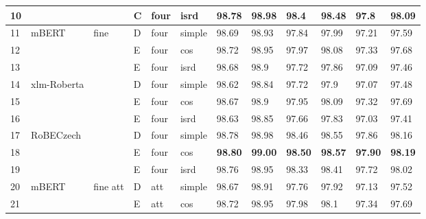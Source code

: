 \begin{table}[!h]
{\begin{tabular}{|l|l|l|l|l|l||llllll|}
10 &                              &                         & C	& four                     & isrd   & 98.78  & 98.98   & 98.4    & 98.48    & 97.8      & 98.09      \\ \hline
11 & \multirow{3}{*}{mBERT} & \multirow{9}{*}{fine}         & D	& four     & simple & 98.69 & 98.93 & 97.84 & 97.99 & 97.21 & 97.59 \\ \cline{1-1} \cline{4-12}
12 &                              &                         & E	& four             & cos    & 98.72  & 98.95   & 97.97   & 98.08    & 97.33     & 97.68      \\ \cline{1-1} \cline{4-12}
13 &                              &                         & E	& four             & isrd   & 98.68  & 98.9    & 97.72   & 97.86    & 97.09     & 97.46      \\ \cline{1-2} \cline{4-12}
14 & \multirow{3}{*}{xlm-Roberta} &                         & D	& four     & simple & 98.62  & 98.84   & 97.72   & 97.9     & 97.07     & 97.48      \\ \cline{1-1} \cline{4-12}
15 &                              &                         & E	& four             & cos    & 98.67  & 98.9    & 97.95   & 98.09    & 97.32     & 97.69      \\ \cline{1-1} \cline{4-12}
16 &                              &                         & E	& four             & isrd   & 98.63  & 98.85   & 97.66   & 97.83    & 97.03     & 97.41      \\ \cline{1-2} \cline{4-12}
17 & \multirow{3}{*}{RoBECzech}   &                         & D	& four     & simple & 98.78  & 98.98   & 98.46   & 98.55    & 97.86     & 98.16      \\ \cline{1-1} \cline{4-12}
18 &                              &                         & E	& four             & cos    & \textbf{98.80}   & \textbf{99.00 }     & \textbf{98.50}    & \textbf{98.57}    & \textbf{97.90 }     & \textbf{98.19 }     \\ \cline{1-1} \cline{4-12}
19 &                              &                         & E	& four             & isrd   & 98.76  & 98.95   & 98.33   & 98.41    & 97.72     & 98.02      \\ \cline{1-2} \cline{4-12} \hline
20 & \multirow{3}{*}{mBERT}  &  \multirow{9}{*}{fine att}   & D	& att                       & simple & 98.67  & 98.91   & 97.76   & 97.92    & 97.13     & 97.52      \\ \cline{1-1} \cline{4-12}
21 &                              &                         & E	& att              & cos    & 98.72  & 98.95   & 97.98   & 98.1     & 97.34     & 97.69      \\ \cline{1-1} \cline{4-12}

\end{tabular}}
\end{table}
